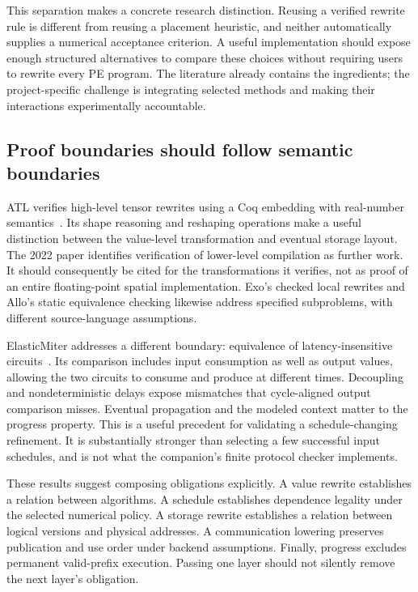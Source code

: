 \documentclass[final,3p,times,authoryear]{elsarticle}
\begin{document}
This separation makes a concrete research distinction. Reusing a verified rewrite rule is different from reusing a placement heuristic, and neither automatically supplies a numerical acceptance criterion. A useful implementation should expose enough structured alternatives to compare these choices without requiring users to rewrite every PE program. The literature already contains the ingredients; the project-specific challenge is integrating selected methods and making their interactions experimentally accountable.

\subsection{Proof boundaries should follow semantic boundaries}
ATL verifies high-level tensor rewrites using a Coq embedding with real-number semantics~\citep{atl2022}. Its shape reasoning and reshaping operations make a useful distinction between the value-level transformation and eventual storage layout. The 2022 paper identifies verification of lower-level compilation as further work. It should consequently be cited for the transformations it verifies, not as proof of an entire floating-point spatial implementation. Exo's checked local rewrites and Allo's static equivalence checking likewise address specified subproblems, with different source-language assumptions.

ElasticMiter addresses a different boundary: equivalence of latency-insensitive circuits~\citep{elasticmiter2025}. Its comparison includes input consumption as well as output values, allowing the two circuits to consume and produce at different times. Decoupling and nondeterministic delays expose mismatches that cycle-aligned output comparison misses. Eventual propagation and the modeled context matter to the progress property. This is a useful precedent for validating a schedule-changing refinement. It is substantially stronger than selecting a few successful input schedules, and is not what the companion's finite protocol checker implements.

These results suggest composing obligations explicitly. A value rewrite establishes a relation between algorithms. A schedule establishes dependence legality under the selected numerical policy. A storage rewrite establishes a relation between logical versions and physical addresses. A communication lowering preserves publication and use order under backend assumptions. Finally, progress excludes permanent valid-prefix execution. Passing one layer should not silently remove the next layer's obligation.
\end{document}
